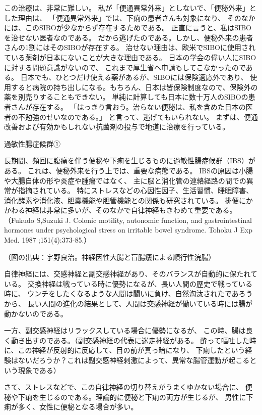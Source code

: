 この治療は、非常に難しい。 
私が「便通異常外来」としないで、「便秘外来」とした理由は、
「便通異常外来」では、下痢の患者さんも対象になり、
そのなかには、このSIBOが少なからず存在するためである。
正直に言うと、私はSIBOを治せない医者なのである。
だから逃げたのである。しかし、便秘外来の患者さんの1割にはそのSIBOが存在する。 
治せない理由は、欧米でSIBOに使用されている薬剤が日本にないことが大きな理由である。
日本の学会の偉い人にSIBOに対する問題意識がないので、
これまで厚生省へ申請もしてこなかったのである。
日本でも、ひとつだけ使える薬があるが、SIBOには保険適応外であり、
使用すると病院の持ち出しになる。もちろん、日本は皆保険制度なので、保険外の薬を別売りすることもできない。 
単純に計算しても日本に数十万人のSIBOの患者さんが存在する。 
「はっきり言おう。治らない便秘は、私を含めた日本の医者の不勉強のせいなのである。」 
と言って、逃げてもいられない。 
まずは、便通改善および有効かもしれない抗菌剤の投与で地道に治療を行っている。

過敏性腸症候群①

長期間、頻回に腹痛を伴う便秘や下痢を生じるものに過敏性腸症候群（IBS）がある。
これは、便秘外来を行う上では、重要な病態である。 
IBSの原因は小腸や大腸自体の形や炎症や腫瘍ではなく、
主に脳と消化管の連絡経路の間での異常が指摘されている。
特にストレスなどの心因性因子、生活習慣、睡眠障害、
消化酵素や消化液、胆嚢機能や胆管機能との関係も研究されている。 
排便にかかわる神経は非常に多いが、そのなかで自律神経もきわめて重要である。
（Fukudo S,Suzuki J. Colonic motility, autonomic function, and gastrointestinal hormones under psychological stress on irritable bowel syndrome. Tohoku J Exp Med. 1987 ;151(4):373-85.） 
 

（図の出典：宇野良治。神経因性大腸と盲腸瘻による順行性浣腸） 


自律神経には、交感神経と副交感神経があり、そのバランスが自動的に保たれている。
交換神経は戦っている時に優勢になるが、長い人間の歴史で戦っている時に、
ウンチをしたくなるような人間は闘いに負け、自然淘汰されたであろうから、
長い人間の進化の結果として、人間は交感神経が働いている時には腸が動かないのである。 


一方、副交感神経はリラックスしている場合に優勢になるが、
この時、腸は良く動き出すのである。（副交感神経の代表に迷走神経がある。
酔って嘔吐した時に、この神経が反射的に反応して、目の前が真っ暗になり、
下痢したという経験はないだろうか？これは副交感神経刺激によって、異常な腸管運動が起こるという現象である） 

さて、ストレスなどで、この自律神経の切り替えがうまくゆかない場合に、
便秘や下痢を生じるのである。理論的に便秘と下痢の両方が生じるが、
男性に下痢が多く、女性に便秘となる場合が多い。 

